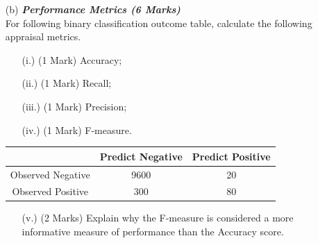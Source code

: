 \documentclass[a4paper,12pt]{article}
\begin{document}
\begin{itemize}
	\item[(b)] \textbf{\textit{Performance Metrics (6 Marks)}}\\
	For following binary classification outcome table, calculate the following appraisal metrics.
	\begin{itemize}	
		\item[(i.)] (1 Mark)	Accuracy;
		\item[(ii.)] (1 Mark)	Recall;
		\item[(iii.)] (1 Mark)	Precision;
		\item[(iv.)] (1 Mark)	F-measure.
	\end{itemize}	
	\vspace{-0.6cm}
		\begin{center}
		\begin{tabular}{|c|c|c|}
			\hline  & \phantom{spa}Predict Negative\phantom{spa} & \phantom{spa}Predict Positive\phantom{spa} \\ 
			\hline\phantom{spa} Observed Negative \phantom{spa}&	9600	&	20	\\ 
			\hline \phantom{spa}Observed Positive\phantom{spa} & 	300	&	80	\\ 
			\hline 
		\end{tabular} 
	\end{center}
	
	\begin{itemize}	
		\item[(v.)] (2 Marks) Explain why the F-measure is considered a more informative measure of performance than the Accuracy score.
	
	\end{itemize}
\end{itemize}






\newpage



\newpage
\end{document}
